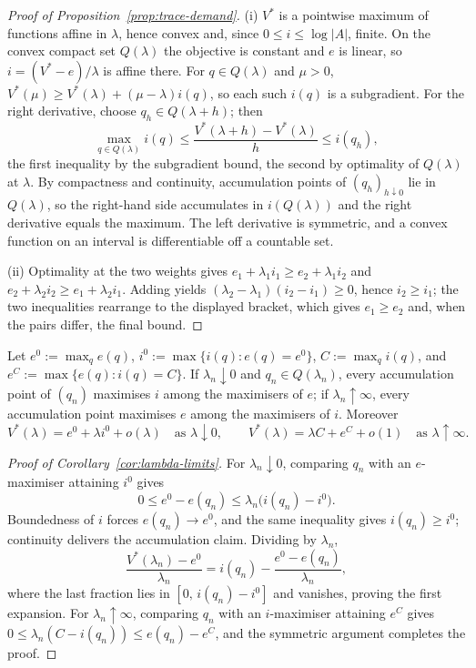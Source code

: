 \begin{proof}[Proof of Proposition~\ref{prop:trace-demand}]
(i) $V^*$ is a pointwise maximum of functions affine in $\lambda$, hence convex and, since
$0\le i\le\log|A|$, finite.  On the convex compact set $Q(\lambda)$ the objective is constant and $e$ is linear, so
$i=(V^*-e)/\lambda$ is affine there.  For $q\in Q(\lambda)$ and $\mu>0$,
$V^*(\mu)\ge V^*(\lambda)+(\mu-\lambda)i(q)$, so each such $i(q)$ is a subgradient.  For the right derivative,
choose $q_h\in Q(\lambda+h)$; then
\[
 \max_{q\in Q(\lambda)}i(q)
 \le\frac{V^*(\lambda+h)-V^*(\lambda)}{h}
 \le i(q_h),
\]
the first inequality by the subgradient bound, the second by optimality of $Q(\lambda)$ at $\lambda$.  By
compactness and continuity, accumulation points of $(q_h)_{h\downarrow0}$ lie in $Q(\lambda)$, so the right-hand
side accumulates in $i(Q(\lambda))$ and the right derivative equals the maximum.  The left derivative is symmetric,
and a convex function on an interval is differentiable off a countable set.

(ii) Optimality at the two weights gives
$e_1+\lambda_1i_1\ge e_2+\lambda_1i_2$ and $e_2+\lambda_2i_2\ge e_1+\lambda_2i_1$.  Adding yields
$(\lambda_2-\lambda_1)(i_2-i_1)\ge0$, hence $i_2\ge i_1$; the two inequalities rearrange to the displayed bracket,
which gives $e_1\ge e_2$ and, when the pairs differ, the final bound.
\end{proof}

\begin{corollary}\label{cor:lambda-limits}
Let $e^0:=\max_qe(q)$, $i^0:=\max\{i(q):e(q)=e^0\}$, $C:=\max_qi(q)$, and $e^C:=\max\{e(q):i(q)=C\}$.  If
$\lambda_n\downarrow0$ and $q_n\in Q(\lambda_n)$, every accumulation point of $(q_n)$ maximises $i$ among the
maximisers of $e$; if $\lambda_n\uparrow\infty$, every accumulation point maximises $e$ among the maximisers of
$i$.  Moreover
\[
 V^*(\lambda)=e^0+\lambda i^0+o(\lambda)
 \quad\text{as }\lambda\downarrow0,
 \qquad
 V^*(\lambda)=\lambda C+e^C+o(1)
 \quad\text{as }\lambda\uparrow\infty.
\]
\end{corollary}

\begin{proof}[Proof of Corollary~\ref{cor:lambda-limits}]
For $\lambda_n\downarrow0$, comparing $q_n$ with an $e$-maximiser attaining $i^0$ gives
\[
 0\le e^0-e(q_n)\le\lambda_n\bigl(i(q_n)-i^0\bigr).
\]
Boundedness of $i$ forces $e(q_n)\to e^0$, and the same inequality gives $i(q_n)\ge i^0$; continuity delivers the
accumulation claim.  Dividing by $\lambda_n$,
\[
 \frac{V^*(\lambda_n)-e^0}{\lambda_n}=i(q_n)-\frac{e^0-e(q_n)}{\lambda_n},
\]
where the last fraction lies in $[0,\,i(q_n)-i^0]$ and vanishes, proving the first expansion.  For
$\lambda_n\uparrow\infty$, comparing $q_n$ with an $i$-maximiser attaining $e^C$ gives
$0\le\lambda_n(C-i(q_n))\le e(q_n)-e^C$, and the symmetric argument completes the proof.
\end{proof}

